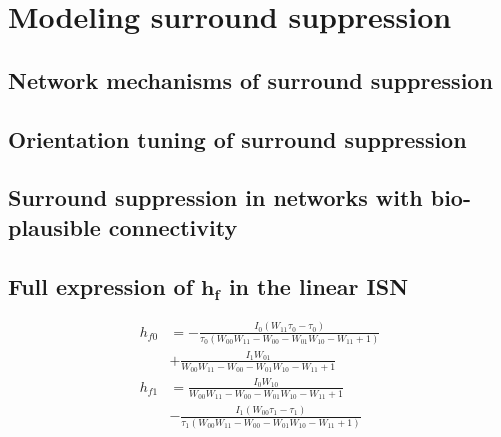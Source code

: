 \documentclass[10pt,conference,compsocconf,a4paper]{IEEEtran}
\renewcommand{\vec}[1]{\boldsymbol{#1}}
\begin{document}
\section{Modeling surround suppression}
\label{sec2}

		

	\subsection{Network mechanisms of surround suppression}
	\label{sec21}

	\subsection{Orientation tuning of surround suppression}
	\label{sec22}

	\subsection{Surround suppression in networks with bio-plausible connectivity}
	\label{sec23}



\newpage



\newpage
\appendix

\subsection{Full expression of $\vec{h_f}$ in the linear ISN}
\label{sec:hf_full}

\begin{equation*} \label{eq:hf_full}
	\begin{aligned}
		h_{f0} &= - \frac{I_{0} \left(W_{11} \tau_{0} - \tau_{0}\right)}{\tau_{0} \left(W_{00} W_{11} - W_{00} - W_{01} W_{10} - W_{11} + 1\right)} \\ &+\frac{I_{1} W_{01}}{W_{00} W_{11} - W_{00} - W_{01} W_{10} - W_{11} + 1}\\
		h_{f1} &= \frac{I_{0} W_{10}}{W_{00} W_{11} - W_{00} - W_{01} W_{10} - W_{11} + 1} \\ &- \frac{I_{1} \left(W_{00} \tau_{1} - \tau_{1}\right)}{\tau_{1} \left(W_{00} W_{11} - W_{00} - W_{01} W_{10} - W_{11} + 1\right)}
	\end{aligned}
\end{equation*}
\end{document}
